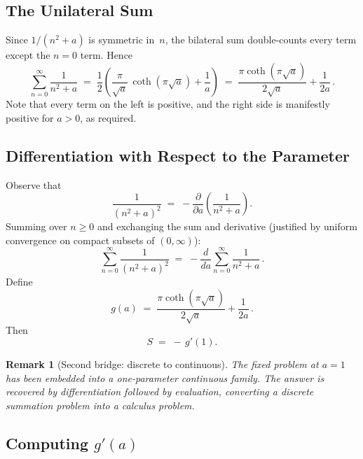 \documentclass[12pt]{article}
\newtheorem{remark}[theorem]{Remark}
\begin{document}
\subsection{The Unilateral Sum}

Since $1/(n^2+a)$ is symmetric in~$n$, the bilateral sum double-counts
every term except the $n=0$ term.  Hence
\begin{equation}\label{eq:unilateral}
\sum_{n=0}^{\infty}\frac{1}{n^2+a}
\;=\;\frac{1}{2}\!\left(\frac{\pi}{\sqrt{a}}\,\coth(\pi\sqrt{a})+\frac{1}{a}\right)
\;=\;\frac{\pi\coth(\pi\sqrt{a})}{2\sqrt{a}}+\frac{1}{2a}\,.
\end{equation}
Note that every term on the left is positive, and the right side is
manifestly positive for $a>0$, as required.

\subsection{Differentiation with Respect to the Parameter}

Observe that
\begin{equation}\label{eq:diff-trick}
\frac{1}{(n^2+a)^2}\;=\;-\frac{\partial}{\partial a}\!\left(\frac{1}{n^2+a}\right).
\end{equation}
Summing over $n\ge 0$ and exchanging the sum and derivative (justified by
uniform convergence on compact subsets of $(0,\infty)$):
\begin{equation}\label{eq:sum-diff}
\sum_{n=0}^{\infty}\frac{1}{(n^2+a)^2}\;=\;-\frac{d}{da}\sum_{n=0}^{\infty}\frac{1}{n^2+a}\,.
\end{equation}
Define
\begin{equation}\label{eq:g}
g(a)\;=\;\frac{\pi\coth(\pi\sqrt{a})}{2\sqrt{a}}+\frac{1}{2a}\,.
\end{equation}
Then
\begin{equation}\label{eq:S-gprime}
S\;=\;-\,g'(1).
\end{equation}

\begin{remark}[Second bridge: discrete to continuous]\label{rem:bridge2}
The fixed problem at $a=1$ has been embedded into a one-parameter
continuous family.  The answer is recovered by differentiation followed by
evaluation, converting a discrete summation problem into a calculus problem.
\end{remark}

\subsection{Computing $g'(a)$}
\end{document}
